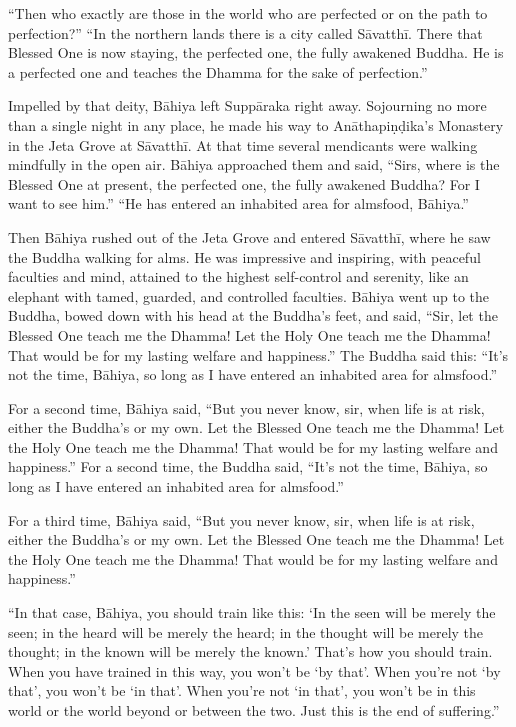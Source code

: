 \documentclass[12pt,openany]{book}%
\begin{document}
“Then who exactly are those in the world who are perfected or on the path to perfection?” “In the northern lands there is a city called \textsanskrit{Sāvatthī}. There that Blessed One is now staying, the perfected one, the fully awakened Buddha. He is a perfected one and teaches the Dhamma for the sake of perfection.” 

Impelled by that deity, \textsanskrit{Bāhiya} left \textsanskrit{Suppāraka} right away. Sojourning no more than a single night in any place, he made his way to \textsanskrit{Anāthapiṇḍika}’s Monastery in the Jeta Grove at \textsanskrit{Sāvatthī}. At that time several mendicants were walking mindfully in the open air. \textsanskrit{Bāhiya} approached them and said, “Sirs, where is the Blessed One at present, the perfected one, the fully awakened Buddha? For I want to see him.” “He has entered an inhabited area for almsfood, \textsanskrit{Bāhiya}.” 

Then \textsanskrit{Bāhiya} rushed out of the Jeta Grove and entered \textsanskrit{Sāvatthī}, where he saw the Buddha walking for alms. He was impressive and inspiring, with peaceful faculties and mind, attained to the highest self-control and serenity, like an elephant with tamed, guarded, and controlled faculties. \textsanskrit{Bāhiya} went up to the Buddha, bowed down with his head at the Buddha’s feet, and said, “Sir, let the Blessed One teach me the Dhamma! Let the Holy One teach me the Dhamma! That would be for my lasting welfare and happiness.” The Buddha said this: “It’s not the time, \textsanskrit{Bāhiya}, so long as I have entered an inhabited area for almsfood.” 

For a second time, \textsanskrit{Bāhiya} said, “But you never know, sir, when life is at risk, either the Buddha’s or my own. Let the Blessed One teach me the Dhamma! Let the Holy One teach me the Dhamma! That would be for my lasting welfare and happiness.” For a second time, the Buddha said, “It’s not the time, \textsanskrit{Bāhiya}, so long as I have entered an inhabited area for almsfood.” 

For a third time, \textsanskrit{Bāhiya} said, “But you never know, sir, when life is at risk, either the Buddha’s or my own. Let the Blessed One teach me the Dhamma! Let the Holy One teach me the Dhamma! That would be for my lasting welfare and happiness.” 

“In that case, \textsanskrit{Bāhiya}, you should train like this: ‘In the seen will be merely the seen; in the heard will be merely the heard; in the thought will be merely the thought; in the known will be merely the known.’ That’s how you should train. When you have trained in this way, you won’t be ‘by that’. When you’re not ‘by that’, you won’t be ‘in that’. When you’re not ‘in that’, you won’t be in this world or the world beyond or between the two. Just this is the end of suffering.” 
\end{document}
